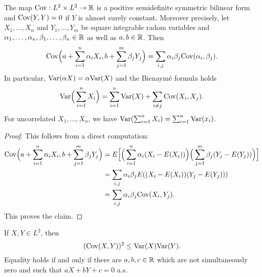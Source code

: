\begin{theorem}
The map $\mathrm{Cov}:L^2\times L^2\to\mathbb{R}$ is a positive semidefinite symmetric bilinear form and $\mathrm{Cov}(Y,Y)=0$ if $Y$ is almost surely constant. Moreover precisely, let $X_1,\dots,X_n$ and $Y_1,\dots,Y_m$ be square integrable radom variables and $\alpha_1,\dots,\alpha_n,\beta_1,\dots,\beta_n\in\mathbb{R}$ as well as $a,b\in\mathbb{R}$. Then
\begin{align*}
\mathrm{Cov}\Big(a+\sum_{i=1}^{n}\alpha_iX_i,b+\sum_{j=1}^{m}\beta_jY_j\Big)=\sum_{i,j}\alpha_i\beta_j\mathrm{Cov}(\alpha_i,\beta_j).
\end{align*}
In particular, $\mathrm{Var}(\alpha X)=\alpha\mathrm{Var}(X)$ and the Bienaym\'e formula holds
\begin{align*}
\mathrm{Var}\Big(\sum_{i=1}^{n}X_i\Big)=\sum_{i=1}^{n}\mathrm{Var}(X)+\sum_{i\neq j}\mathrm{Cov}(X_i,X_j).
\end{align*}
For uncorrelated $X_1,\dots,X_n$, we have $\mathrm{Var}(\sum_{i=1}^{n}X_i)=\sum_{i=1}^{n}\mathrm{Var}(x_i)$.
\end{theorem}
\begin{proof}
This follows from a direct computation:
\begin{align*}
\mathrm{Cov}\Big(a+\sum_{i=1}^{n}\alpha_iX_i,b+\sum_{j=1}^{m}\beta_jY_j\Big)&=E\Big[\Big(\sum_{i=1}^{n}\alpha_i(X_i-E(X_i))\Big)\Big(\sum_{j=1}^{m}\beta_j(Y_j-E(Y_j))\Big)\Big]\\
&=\sum_{i,j}\alpha_i\beta_jE((X_i-E(X_i))(Y_j-E(Y_j)))\\
&=\sum_{i,j}\alpha_i\beta_j\mathrm{Cov}(X_i,Y_j).
\end{align*}
This proves the claim.
\end{proof}
\begin{theorem}
If $X,Y\in L^2$, then
\[(\mathrm{Cov}(X,Y))^2\leq\mathrm{Var}(X)\mathrm{Var}(Y).\]
Equality holds if and only if there are $a,b,c\in\mathbb{R}$ which are not simultaneously zero and such that $aX+bY+c=0$ a.s.
\end{theorem}
